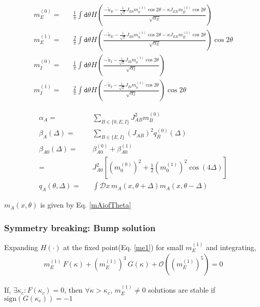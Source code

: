 \documentclass[a4paper]{article}
\newcommand{\sign}{\text{sign}}
\begin{document}
\begin{eqnarray}
m_E^{(0)} =&& \frac{1}{\pi} \int \mathtt{d} \theta H \left( \frac{-\tilde{u}_E - \frac{1}{\sqrt{2}} J_{E0} m_0^{(1)} \cos 2 \theta - \kappa  J_{EE} m_E^{(1)} \cos 2 \theta}{\sqrt{\alpha_E} } \right)  \label{me0} \\
m_E^{(1)} =&& \frac{2}{\pi} \int \mathtt{d} \theta H \left( \frac{-\tilde{u}_E - \frac{1}{\sqrt{2}} J_{E0} m_0^{(1)} \cos 2 \theta - \kappa  J_{EE} m_E^{(1)} \cos 2 \theta}{\sqrt{\alpha_E} } \right) \cos 2 \theta  \label{me1} \\
m_I^{(0)} =&& \frac{1}{\pi} \int \mathtt{d} \theta H \left( \frac{-\tilde{u}_I - \frac{1}{\sqrt{2}} J_{I0} m_0^{(1)} \cos 2 \theta}{\sqrt{\alpha_I} } \right)  \label{mi0} \\
m_I^{(1)} =&& \frac{2}{\pi} \int \mathtt{d} \theta H \left( \frac{-\tilde{u}_I - \frac{1}{\sqrt{2}} J_{I0} m_0^{(1)} \cos 2 \theta }{\sqrt{\alpha_I} } \right) \cos 2 \theta  \label{mi1}
\end{eqnarray}

\begin{eqnarray}
\alpha_{A} =&& \sum_{B \in \lbrace 0, E, I \rbrace} J_{AB}^2 m_B^{(0)} \\
\beta_{A}(\Delta) =&& \sum_{B \in \lbrace E, I \rbrace}  \left(J_{AB}\right)^2 q_B^{(0)}(\Delta) \\
\beta_{A0} (\Delta) =&& \beta_{A0}^{(0)} + \beta_{A0}^{(1)} \nonumber \\
=&& J^2_{A0} \left[ (m_0^{(0)})^2 + \frac{1}{2}(m_0^{(1)})^2  \cos(4\Delta) \right] \\
q_A (\theta, \Delta) =&& \int \mathcal{D} x \,  m_A(x, \theta + \Delta)  m_A(x, \theta - \Delta) 
\end{eqnarray}

$m_A(x, \theta)$ is given by Eq. \ref{mAiofTheta}

\subsubsection*{Symmetry breaking: Bump solution}
Expanding $H(\cdot)$ at the fixed point(Eq. \ref{me1}) for small $m_E^{(1)}$ and integrating,
\begin{eqnarray}
m_E^{(1)} \, F(\kappa) + \left( m_E^{(1)} \right)^3 \,  G(\kappa) + \mathcal{O} \left(\left( m_E^{(1)} \right)^5 \right) = 0
\end{eqnarray}

If, $\exists \kappa_c: F(\kappa_{c}) = 0$, then $\forall \kappa>\kappa_c$, $m_E^{(1)} \neq 0$ solutions are stable if $\sign (G(\kappa_c)) = -1 $  
\end{document}
